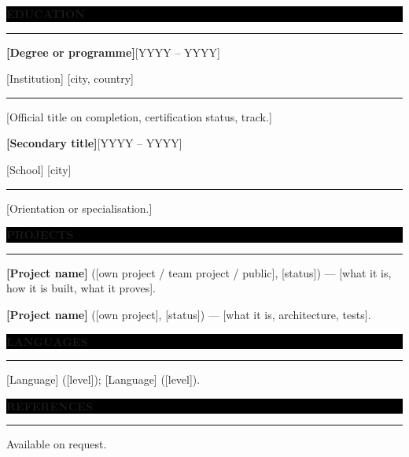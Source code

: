 \documentclass[10pt]{article}
\newcommand{\sectionbar}[1]{%
  \needspace{4\baselineskip}%
  \par\vspace{7pt}%
  \noindent\colorbox{black}{\parbox{\dimexpr\linewidth-2\fboxsep}{\color{white}\bfseries\footnotesize\MakeUppercase{#1}}}%
  \par\vspace{2pt}%
  \noindent\rule{\linewidth}{0.8pt}%
  \par\vspace{2pt}%
}
\newcommand{\entry}[3]{%
  \par\vspace{2pt}%
  {\bfseries #1}\hfill{\footnotesize #2}\par
  {\footnotesize #3}\par\vspace{1pt}%
  \noindent\rule{\linewidth}{0.3pt}\par\vspace{2pt}%
}
\begin{document}
\sectionbar{Education}

\entry{[Degree or programme]}{[YYYY -- YYYY]}{[Institution] \textbar{} [city, country]}
{\footnotesize [Official title on completion, certification status, track.]}

\vspace{2pt}
\entry{[Secondary title]}{[YYYY -- YYYY]}{[School] \textbar{} [city]}
{\footnotesize [Orientation or specialisation.]}

\sectionbar{Projects}

{\footnotesize
\textbf{[Project name]} ([own project / team project / public], [status]) --- [what it is, how it is
built, what it proves].\par\vspace{2pt}
\textbf{[Project name]} ([own project], [status]) --- [what it is, architecture, tests].}

\sectionbar{Languages}

{\footnotesize [Language] ([level]); [Language] ([level]).}

\sectionbar{References}

{\footnotesize Available on request.}

\AtEndDocument{\label{LastPage}}
\end{document}
